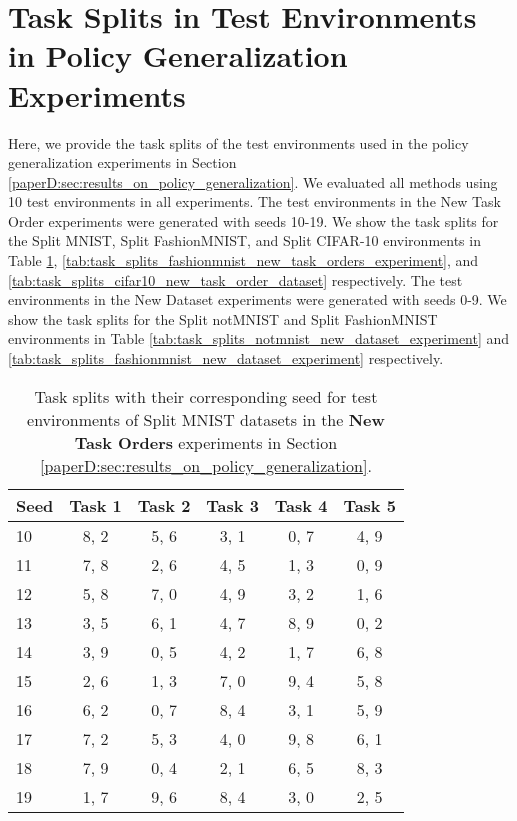 
\section{Task Splits in Test Environments in Policy Generalization Experiments}\label{paperD:app:task_split_tables}

Here, we provide the task splits of the test environments used in the policy generalization experiments in Section \ref{paperD:sec:results_on_policy_generalization}. We evaluated all methods using 10 test environments in all experiments.
The test environments in the New Task Order experiments were generated with seeds 10-19. We show the task splits for the Split MNIST, Split FashionMNIST, and Split CIFAR-10 environments in Table \ref{tab:task_splits_mnist_new_task_orders_experiment}, \ref{tab:task_splits_fashionmnist_new_task_orders_experiment}, and \ref{tab:task_splits_cifar10_new_task_order_dataset} respectively. 
The test environments in the New Dataset experiments were generated with seeds 0-9. We show the task splits for the Split notMNIST and Split FashionMNIST environments in Table \ref{tab:task_splits_notmnist_new_dataset_experiment} and \ref{tab:task_splits_fashionmnist_new_dataset_experiment} respectively. 



\begin{table}[h]
    \centering
    \small
    \caption{Task splits with their corresponding seed for test environments of Split MNIST datasets in the {\bf New Task Orders} experiments in Section \ref{paperD:sec:results_on_policy_generalization}. }
    \begin{tabular}{l c c c c c}
        \toprule %
         {\bf Seed} & {\bf Task 1} & {\bf Task 2} & {\bf Task 3} & {\bf Task 4} & {\bf Task 5} \\
        \midrule
        10 & 8, 2 & 5, 6 & 3, 1 & 0, 7 & 4, 9   \\ \midrule 
        11 & 7, 8 & 2, 6 & 4, 5 & 1, 3 & 0, 9  \\ \midrule 
        12 & 5, 8 & 7, 0 & 4, 9 & 3, 2 & 1, 6  \\ \midrule 
        13 & 3, 5 & 6, 1 & 4, 7 & 8, 9 & 0, 2  \\ \midrule
        14 & 3, 9 & 0, 5 & 4, 2 & 1, 7 & 6, 8  \\ \midrule 
        15 & 2, 6 & 1, 3 & 7, 0 & 9, 4 & 5, 8   \\ \midrule
        16 & 6, 2 & 0, 7 & 8, 4 & 3, 1 & 5, 9   \\ \midrule
        17 & 7, 2 & 5, 3 & 4, 0 & 9, 8 & 6, 1  \\ \midrule 
        18 & 7, 9 & 0, 4 & 2, 1 & 6, 5 & 8, 3  \\ \midrule
        19 & 1, 7 & 9, 6 & 8, 4 & 3, 0 & 2, 5   \\
        \bottomrule %
    \end{tabular}
    \label{tab:task_splits_mnist_new_task_orders_experiment}
\end{table}


